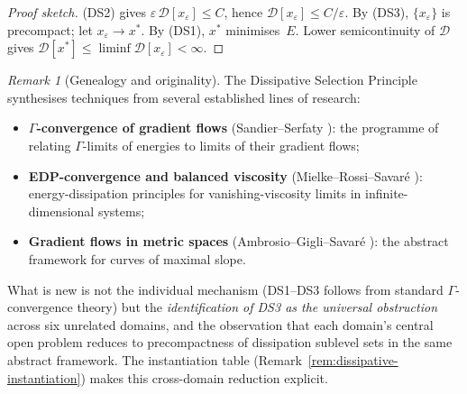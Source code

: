 \documentclass[12pt,a4paper]{article}
\theoremstyle{definition}
\theoremstyle{remark}
\newtheorem{remark}[theorem]{Remark}
\begin{document}
\begin{proof}[Proof sketch]
(DS2) gives $\varepsilon\,\mathcal{D}[x_\varepsilon] \leq C$, hence $\mathcal{D}[x_\varepsilon] \leq C/\varepsilon$. By (DS3), $\{x_\varepsilon\}$ is precompact; let $x_\varepsilon \to x^*$. By (DS1), $x^*$ minimises~$E$. Lower semicontinuity of $\mathcal{D}$ gives $\mathcal{D}[x^*] \leq \liminf \mathcal{D}[x_\varepsilon] < \infty$.
\end{proof}

\begin{remark}[Genealogy and originality]\label{rem:ds-genealogy}
The Dissipative Selection Principle synthesises techniques from several established lines of research:
\begin{itemize}
\item \textbf{$\Gamma$-convergence of gradient flows} (Sandier--Serfaty \cite{SandierSerfaty2004}): the programme of relating $\Gamma$-limits of energies to limits of their gradient flows;
\item \textbf{EDP-convergence and balanced viscosity} (Mielke--Rossi--Savar\'e \cite{MielkeRossiSavare2016}): energy-dissipation principles for vanishing-viscosity limits in infinite-dimensional systems;
\item \textbf{Gradient flows in metric spaces} (Ambrosio--Gigli--Savar\'e \cite{AGS2008}): the abstract framework for curves of maximal slope.
\end{itemize}
What is new is not the individual mechanism (DS1--DS3 follows from standard $\Gamma$-convergence theory) but the \emph{identification of DS3 as the universal obstruction} across six unrelated domains, and the observation that each domain's central open problem reduces to precompactness of dissipation sublevel sets in the same abstract framework. The instantiation table (Remark~\ref{rem:dissipative-instantiation}) makes this cross-domain reduction explicit.
\end{remark}
\end{document}
